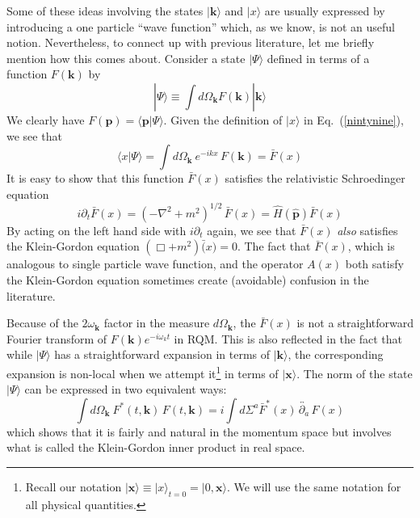 \documentclass[12pt]{article}
\def\eq#1{{Eq.~(\ref{#1})}}
\def\ket#1{|#1\rangle}                    %
\def\amp#1#2{\langle #1 | #2\rangle}      %
\begin{document}
Some of these ideas involving the states $\ket{\bm{k}}$ and $\ket{x}$ are usually expressed by introducing a one particle ``wave function''
which, as we know, is not an useful notion. Nevertheless, to connect up with previous literature, let me briefly mention how this comes about. Consider a state $\ket{\Psi}$ defined in terms of a function $F(\bm{k})$ by
 \begin{equation}
 \ket{\Psi} \equiv \int d\Omega_{\bm{k}} F(\bm{k}) \ket{\bm{k}} 
  \label{14oct18}
 \end{equation} 
 We clearly have $F(\bm{p}) = \amp{\bm{p}}{\Psi}$. Given the definition of $\ket{x}$ in \eq{nintynine}, we see that 
 \begin{equation}
 \amp{x}{\Psi} = \int d\Omega_{\bm{k}}\ e^{-ikx}\, F(\bm{k}) = \bar F(x)
 \end{equation} 
 It is  easy to show that this function $\bar F(x)$ satisfies the relativistic Schroedinger equation 
 \begin{equation}
 i\partial_t \bar F(x) = (-\nabla^2+ m^2)^{1/2} \, \bar F(x) = \hat H(\hat{\bm{p}}) \bar F(x)
 \end{equation}
 By acting on the left hand side with $i\partial_t$ again, we see that $\bar F(x)$ \textit{also} satisfies the Klein-Gordon equation $(\Box +m^2)\bar (x) =0$. The fact that $\bar F(x)$, which is analogous to single particle wave function, and the operator $A(x)$ both satisfy the Klein-Gordon equation sometimes create (avoidable) confusion in the literature.
 
 Because of the $2\omega_{\bm{k}}$ factor in the measure $d\Omega_{\bm{k}}$, the  $\bar F(x)$ is not a straightforward Fourier transform of $F(\bm{k})e^{-i\omega_k t}$ in RQM. This is also reflected in the fact that while $\ket{\Psi}$ has a straightforward expansion in terms of $\ket{\bm{k}}$, the corresponding expansion is non-local when we attempt it\footnote{Recall our notation 
 $
 \ket{\bm{x}} \equiv \ket{x}_{t=0} = \ket{0,\bm{x}}
 $.  We will use the same notation for all physical quantities.}
 in terms of $\ket{\bm{x}}$.
 The norm of the state $\ket{\Psi}$ can be expressed in two equivalent ways: 
 \begin{equation}
 \int d\Omega_{\bm{k}} \ F^*(t,\bm{k})\, F(t, \bm{k}) = i \int d \Sigma^a \bar F^*(x)\, \overleftrightarrow{\partial_a} \, F(x)
 \end{equation} 
which shows that it is fairly and natural in the momentum space but involves what is called the Klein-Gordon inner product in real space.
 
\end{document}
